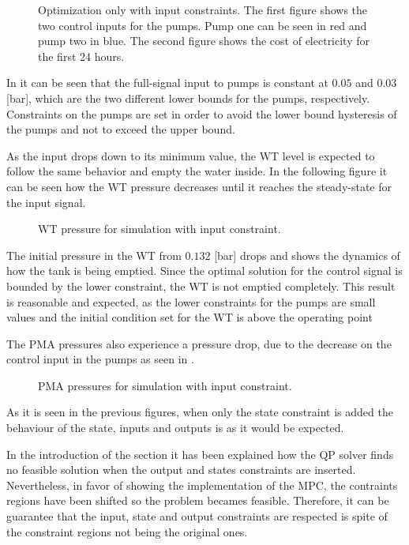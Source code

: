 \begin{figure}[H]
\centering
 
\caption{Optimization only with input constraints. The first figure shows the two control inputs for the pumps. Pump one can be seen in red and pump two in blue. The second figure shows the cost of electricity for the first 24 hours.}
\label{fig:Implementation_shit}
\end{figure}

In  it can be seen that the full-signal input to pumps is constant at $0.05$ and $0.03$ [bar], which are the two different lower bounds for the pumps, respectively. Constraints on the pumps are set in order to avoid the lower bound hysteresis of the pumps and not to exceed the upper bound. 

As the input drops down to its minimum value, the WT level is expected to follow the same behavior and empty the water inside. In the following figure it can be seen how the WT pressure decreases until it reaches the steady-state for the input signal.

\begin{figure}[H]
\centering
 
\caption{WT pressure for simulation with input constraint.}
\label{fig:WT_input}
\end{figure}

The initial pressure in the WT from $0.132$ [bar] drops and shows the dynamics of how the tank is being emptied. Since the optimal solution for the control signal is bounded by the lower constraint, the WT is not emptied completely. This result is reasonable and expected, as the lower constraints for the pumps are small values and the initial condition set for the WT is above the operating point

The PMA pressures also experience a pressure drop, due to the decrease on the control input in the pumps as seen in .

\begin{figure}[H]
\centering
 
\caption{PMA pressures for simulation with input constraint.}
\label{fig:Output_input}
\end{figure}

As it is seen in the previous figures, when only the state constraint is added the behaviour of the state, inputs and outputs is as it would be expected. 

In the introduction of the section it has been explained how the QP solver finds no feasible solution when the output and states constraints are inserted. Nevertheless, in favor of showing the implementation of the MPC, the contraints regions have been shifted so the problem becames feasible. Therefore, it can be guarantee that the input, state and output constraints are respected is spite of the constraint regions not being the original ones. 


